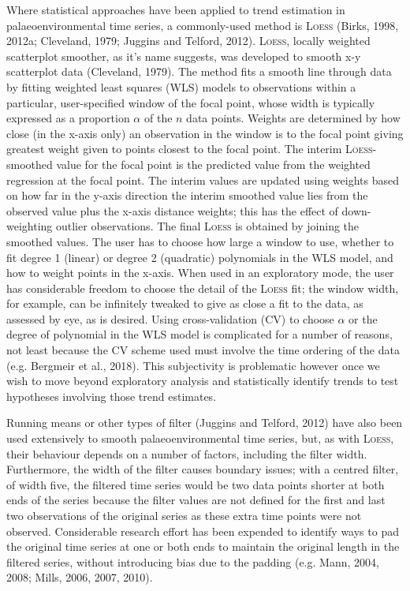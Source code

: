 \documentclass[12pt,]{article}
\newcommand{\loess}{\textsc{Loess}}
\begin{document}
Where statistical approaches have been applied to trend estimation in
palaeoenvironmental time series, a commonly-used method is \loess{}
(Birks, 1998, 2012a; Cleveland, 1979; Juggins and Telford, 2012).
\loess{}, locally weighted scatterplot smoother, as it's name suggests,
was developed to smooth x-y scatterplot data (Cleveland, 1979). The
method fits a smooth line through data by fitting weighted least squares
(WLS) models to observations within a particular, user-specified window
of the focal point, whose width is typically expressed as a proportion
\(\alpha\) of the \(n\) data points. Weights are determined by how close
(in the x-axis only) an observation in the window is to the focal point
giving greatest weight given to points closest to the focal point. The
interim \loess{}-smoothed value for the focal point is the predicted
value from the weighted regression at the focal point. The interim
values are updated using weights based on how far in the y-axis
direction the interim smoothed value lies from the observed value plus
the x-axis distance weights; this has the effect of down-weighting
outlier observations. The final \loess{} is obtained by joining the
smoothed values. The user has to choose how large a window to use,
whether to fit degree 1 (linear) or degree 2 (quadratic) polynomials in
the WLS model, and how to weight points in the x-axis. When used in an
exploratory mode, the user has considerable freedom to choose the detail
of the \loess{} fit; the window width, for example, can be infinitely
tweaked to give as close a fit to the data, as assessed by eye, as is
desired. Using cross-validation (CV) to choose \(\alpha\) or the degree
of polynomial in the WLS model is complicated for a number of reasons,
not least because the CV scheme used must involve the time ordering of
the data (e.g. Bergmeir et al., 2018). This subjectivity is problematic
however once we wish to move beyond exploratory analysis and
statistically identify trends to test hypotheses involving those trend
estimates.

Running means or other types of filter (Juggins and Telford, 2012) have
also been used extensively to smooth palaeoenvironmental time series,
but, as with \loess{}, their behaviour depends on a number of factors,
including the filter width. Furthermore, the width of the filter causes
boundary issues; with a centred filter, of width five, the filtered time
series would be two data points shorter at both ends of the series
because the filter values are not defined for the first and last two
observations of the original series as these extra time points were not
observed. Considerable research effort has been expended to identify
ways to pad the original time series at one or both ends to maintain the
original length in the filtered series, without introducing bias due to
the padding (e.g. Mann, 2004, 2008; Mills, 2006, 2007, 2010).
\end{document}
